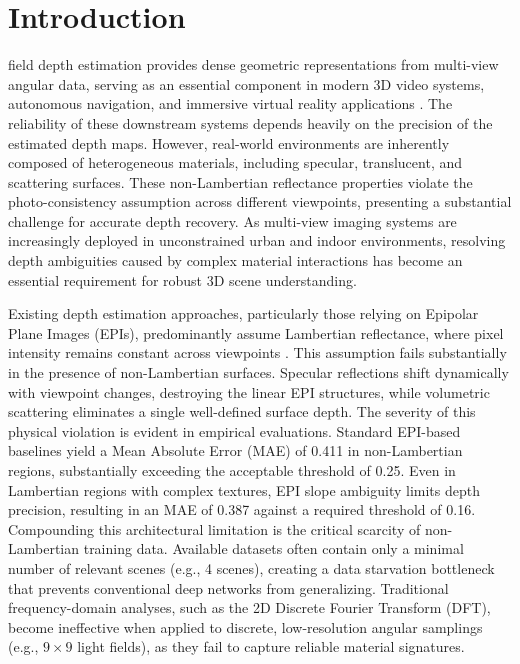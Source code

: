 \documentclass[lettersize,journal]{IEEEtran}
\begin{document}
\section{Introduction}

 field depth estimation provides dense geometric representations from multi-view angular data, serving as an essential component in modern 3D video systems, autonomous navigation, and immersive virtual reality applications . The reliability of these downstream systems depends heavily on the precision of the estimated depth maps. However, real-world environments are inherently composed of heterogeneous materials, including specular, translucent, and scattering surfaces. These non-Lambertian reflectance properties violate the photo-consistency assumption across different viewpoints, presenting a substantial challenge for accurate depth recovery. As multi-view imaging systems are increasingly deployed in unconstrained urban and indoor environments, resolving depth ambiguities caused by complex material interactions has become an essential requirement for robust 3D scene understanding.

Existing depth estimation approaches, particularly those relying on Epipolar Plane Images (EPIs), predominantly assume Lambertian reflectance, where pixel intensity remains constant across viewpoints . This assumption fails substantially in the presence of non-Lambertian surfaces. Specular reflections shift dynamically with viewpoint changes, destroying the linear EPI structures, while volumetric scattering eliminates a single well-defined surface depth. The severity of this physical violation is evident in empirical evaluations. Standard EPI-based baselines yield a Mean Absolute Error (MAE) of 0.411 in non-Lambertian regions, substantially exceeding the acceptable threshold of 0.25. Even in Lambertian regions with complex textures, EPI slope ambiguity limits depth precision, resulting in an MAE of 0.387 against a required threshold of 0.16. Compounding this architectural limitation is the critical scarcity of non-Lambertian training data. Available datasets often contain only a minimal number of relevant scenes (e.g., 4 scenes), creating a data starvation bottleneck that prevents conventional deep networks from generalizing. Traditional frequency-domain analyses, such as the 2D Discrete Fourier Transform (DFT), become ineffective when applied to discrete, low-resolution angular samplings (e.g., $9 \times 9$ light fields), as they fail to capture reliable material signatures.
\end{document}
